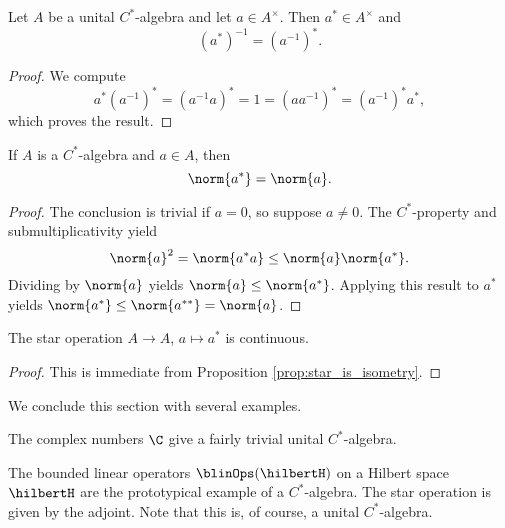 \begin{proposition}\label{prop:inverse_star_commute}
Let $A$ be a unital $C^*$-algebra and let $a \in A^\times$. Then $a^* \in A^\times$ and 
\begin{equation}
(a^*)^{-1} = (a^{-1})^*.
\end{equation}
\end{proposition}

\begin{proof}
We compute
\begin{equation}
a^*(a^{-1})^* = (a^{-1} a)^* = 1 = (aa^{-1})^* = (a^{-1})^* a^*,
\end{equation}
which proves the result.
\end{proof}

\begin{proposition}\label{prop:star_is_isometry}
If $A$ is a $C^*$-algebra and $a \in A$, then
\begin{equation}
\norm{a^*} = \norm{a}.
\end{equation}
\end{proposition}

\begin{proof}
The conclusion is trivial if $a = 0$, so suppose $a \neq 0$. The $C^*$-property and submultiplicativity yield
\begin{equation}
\norm{a}^2 = \norm{a^*a} \leq \norm{a} \norm{a^*}.
\end{equation}
Dividing by $\norm{a}$ yields $\norm{a} \leq \norm{a^*}$. Applying this result to $a^*$ yields $\norm{a^*} \leq \norm{a^{**}} = \norm{a}$.
\end{proof}



\begin{corollary}
The star operation $A \rightarrow A$, $a \mapsto a^*$ is continuous.
\end{corollary}

\begin{proof}
This is immediate from Proposition \ref{prop:star_is_isometry}.
\end{proof}


We conclude this section with several examples.

\begin{example}
The complex numbers $\C$ give a fairly trivial unital $C^*$-algebra.
\end{example}

\begin{example}
The bounded linear operators $\blinOps(\hilbertH)$ on a Hilbert space $\hilbertH$ are the prototypical example of a $C^*$-algebra. The star operation is given by the adjoint. Note that this is, of course, a unital $C^*$-algebra.
\end{example}

